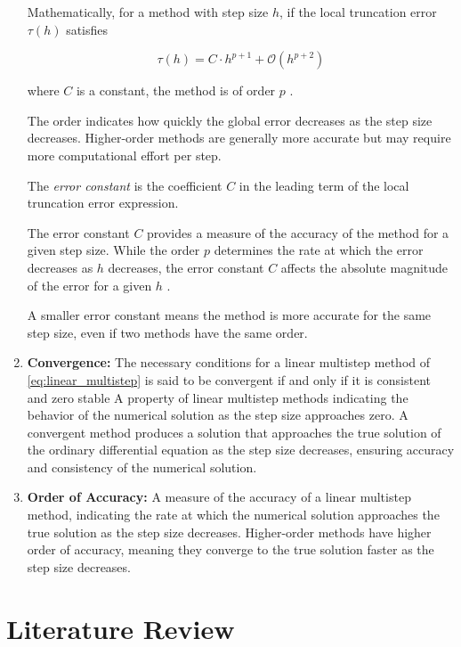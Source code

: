\documentclass[a4paper, twoside]{report} %
\begin{document}
\begin{enumerate}
		Mathematically, for a method with step size \( h \), if the local truncation error \( \tau(h) \) satisfies

		\begin{equation}
			\tau(h) = C \cdot h^{p+1} + \mathcal{O}(h^{p+2})
		\end{equation}

		where \( C \) is a constant, the method is of order \( p \) \cite{BUTCHER20091834}.

		The order indicates how quickly the global error decreases as the step size decreases. Higher-order methods are generally more accurate but may require more computational effort per step.


		The \textit{error constant} is the coefficient \( C \) in the leading term of the local truncation error expression.

		The error constant \( C \) provides a measure of the accuracy of the method for a given step size. While the order \( p \) determines the rate at which the error decreases as \( h \) decreases, the error constant \( C \) affects the absolute magnitude of the error for a given \( h \) \cite{atkinson1989introduction}.

		A smaller error constant means the method is more accurate for the same step size, even if two methods have the same order.


		\item \textbf{Convergence:}
		The necessary conditions for a linear multistep method of \eqref{eq:linear_multistep} is said to be convergent if and only if it is consistent and zero stable
		A property of linear multistep methods indicating the behavior of the numerical solution as the step size approaches zero. A convergent method produces a solution that approaches the true solution of the ordinary differential equation as the step size decreases, ensuring accuracy and consistency of the numerical solution.

		\item \textbf{Order of Accuracy:} A measure of the accuracy of a linear multistep method, indicating the rate at which the numerical solution approaches the true solution as the step size decreases. Higher-order methods have higher order of accuracy, meaning they converge to the true solution faster as the step size decreases.
	\end{enumerate}



	\raggedbottom
	\chapter{Literature Review}
\end{document}
